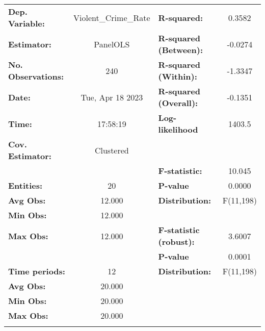 \begin{center}
\begin{tabular}{lclc}
\toprule
\textbf{Dep. Variable:}           & Violent\_Crime\_Rate & \textbf{  R-squared:         }   &      0.3582      \\
\textbf{Estimator:}               &       PanelOLS       & \textbf{  R-squared (Between):}  &     -0.0274      \\
\textbf{No. Observations:}        &         240          & \textbf{  R-squared (Within):}   &     -1.3347      \\
\textbf{Date:}                    &   Tue, Apr 18 2023   & \textbf{  R-squared (Overall):}  &     -0.1351      \\
\textbf{Time:}                    &       17:58:19       & \textbf{  Log-likelihood     }   &      1403.5      \\
\textbf{Cov. Estimator:}          &      Clustered       & \textbf{                     }   &                  \\
\textbf{}                         &                      & \textbf{  F-statistic:       }   &      10.045      \\
\textbf{Entities:}                &          20          & \textbf{  P-value            }   &      0.0000      \\
\textbf{Avg Obs:}                 &        12.000        & \textbf{  Distribution:      }   &    F(11,198)     \\
\textbf{Min Obs:}                 &        12.000        & \textbf{                     }   &                  \\
\textbf{Max Obs:}                 &        12.000        & \textbf{  F-statistic (robust):} &      3.6007      \\
\textbf{}                         &                      & \textbf{  P-value            }   &      0.0001      \\
\textbf{Time periods:}            &          12          & \textbf{  Distribution:      }   &    F(11,198)     \\
\textbf{Avg Obs:}                 &        20.000        & \textbf{                     }   &                  \\
\textbf{Min Obs:}                 &        20.000        & \textbf{                     }   &                  \\
\textbf{Max Obs:}                 &        20.000        & \textbf{                     }   &                  \\
\textbf{}                         &                      & \textbf{                     }   &                  \\

\end{tabular}
\end{center}
